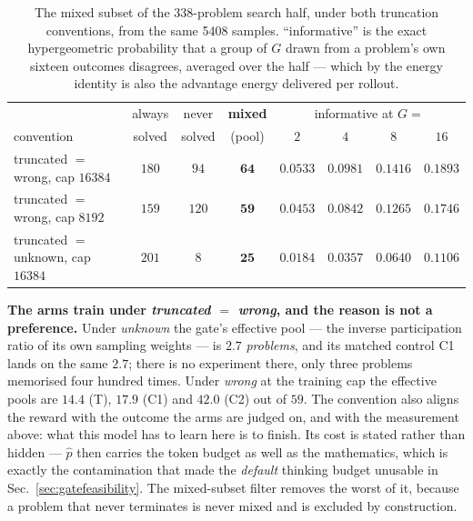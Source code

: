 \begin{table}[t]
\centering\small
\caption{The mixed subset of the 338-problem search half, under both truncation conventions,
from the same 5408 samples. ``informative'' is the exact hypergeometric probability that a
group of $G$ drawn from a problem's own sixteen outcomes disagrees, averaged over the half ---
which by the energy identity is also the advantage energy delivered per rollout.}
\label{tab:b200pool}
\begin{tabular}{lccc@{\qquad}cccc}
\toprule
 & always & never & \textbf{mixed} & \multicolumn{4}{c}{informative at $G=$} \\
convention & solved & solved & (pool) & $2$ & $4$ & $8$ & $16$ \\
\midrule
truncated $=$ wrong, cap $16384$   & $180$ & $94$  & $\mathbf{64}$ & $0.0533$ & $0.0981$ & $0.1416$ & $0.1893$ \\
truncated $=$ wrong, cap $8192$    & $159$ & $120$ & $\mathbf{59}$ & $0.0453$ & $0.0842$ & $0.1265$ & $0.1746$ \\
truncated $=$ unknown, cap $16384$ & $201$ & $8$   & $\mathbf{25}$ & $0.0184$ & $0.0357$ & $0.0640$ & $0.1106$ \\
\bottomrule
\end{tabular}
\end{table}

\textbf{The arms train under \emph{truncated $=$ wrong}, and the reason is not a preference.}
Under \emph{unknown} the gate's effective pool --- the inverse participation ratio of its own
sampling weights --- is $\mathbf{2.7}$ \emph{problems}, and its matched control C1 lands on the
same $2.7$; there is no experiment there, only three problems memorised four hundred times.
Under \emph{wrong} at the training cap the effective pools are $14.4$ (T), $17.9$ (C1) and
$42.0$ (C2) out of $59$. The convention also aligns the reward with the outcome the arms are
judged on, and with the measurement above: what this model has to learn here is to finish.
Its cost is stated rather than hidden --- $\hat p$ then carries the token budget as well as
the mathematics, which is exactly the contamination that made the \emph{default} thinking
budget unusable in Sec.~\ref{sec:gatefeasibility}. The mixed-subset filter removes the worst
of it, because a problem that never terminates is never mixed and is excluded by construction.

